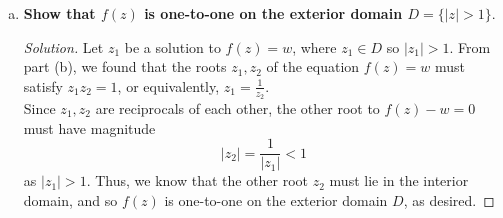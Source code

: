 \documentclass[11pt]{article}
\newenvironment{solution}
  {\renewcommand\qedsymbol{$\blacksquare$}\begin{proof}[Solution]}
  {\end{proof}}
\theoremstyle{definition}
\begin{document}
\begin{enumerate}[a)]
    \begin{solution} We will first show that if $r > 1$, $f(z)$ maps the circle $\{|z| = r\}$ onto an ellipse. Writing $z$ in polar form, we know that $z=re^{i\theta}.$ Thus, we know that
    \[f(z) = z + 1/z = re^{i\theta} + \frac{1}{r}e^{-i\theta}.\]

    Substituting $e^{i\theta} = \cos\theta + i\sin \theta$ and $e^{-i\theta} = \cos(-\theta) + i\sin(-\theta) = \cos \theta - i\sin\theta$, into this expression, we find that
    \begin{align*} f(z) &= re^{i\theta} + \frac{1}{r}e^{-i\theta} \\
    &= r\left(\cos\theta + i\sin \theta \right) + \frac{1}{r}\left( \cos \theta - i\sin\theta\right) \\
    &= \left( r + \frac{1}{r} \right) \cos \theta + i \left(r - \frac{1}{r}\right) \sin \theta.\end{align*}
    
    This is simply the polar form for an ellipse! Thus, we see that the circle $\{|z| = r\}$ is mapped onto an ellipse with equation 
    \[ \frac{u^2}{\left(r + \frac{1}{r}\right)^2} + \frac{v^2}{\left(r - \frac{1}{r}\right)^2} = 1\]

    where $u, v$ represent the real and imaginary components of the images of $z = x+yi$ under $f(z)$. \\

    Observe that since 
    \[ f(z) = re^{i\theta} + \frac{1}{r}e^{-i\theta} = \frac{1}{r} e^{i\theta} + \frac{1}{\left(\frac{1}{r}\right)}e^{i\theta} \]
    we can conclude that $\{|z| = \frac{1}{r} \}$ maps onto the same ellipse, as expected.  \end{solution}

\item \textbf{Show that $f(z)$ is one-to-one on the exterior domain $D = \{|z| > 1\}.$} 
\begin{solution} Let $z_1$ be a solution to $f(z) = w$, where $z_1 \in D$ so $|z_1| > 1$. From part (b), we found that the roots $z_1, z_2$ of the equation $f(z) = w$ must satisfy $z_1z_2 = 1$, or equivalently, $z_1 = \frac{1}{z_2}$. \\

Since $z_1, z_2$ are reciprocals of each other, the other root to $f(z) - w = 0$ must have magnitude 
\[ |z_2| = \frac{1}{|z_1|} < 1\] 
as $|z_1| > 1$. Thus, we know that the other root $z_2$ must lie in the interior domain, and so $f(z)$ is one-to-one on the exterior domain $D$, as desired. \end{solution}


\end{enumerate}
\end{document}
